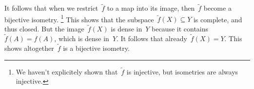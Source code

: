 It follows that when we restrict~$\tilde{f}$ to a map into its image, then~$\tilde{f}$ become a bijective isometry.%
\footnote{We haven’t explicitely shown that~$\tilde{f}$ is injective, but isometries are always injective.}
This shows that the subspace~$\tilde{f}(X) \subseteq Y$ is complete, and thus closed.
But the image~$\tilde{f}(X)$ is dense in~$Y$ because it contains~$\tilde{f}(A) = f(A)$, which is dense in~$Y$.
It follows that already~$\tilde{f}(X) = Y$.
This shows altogether~$\tilde{f}$ is a bijective isometry.





